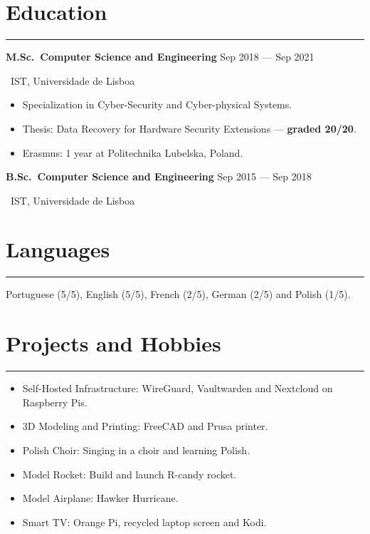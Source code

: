 \documentclass[11pt,a4paper]{article}
\begin{document}
\section*{Education}

\hrule

\textbf{M.Sc.\ Computer Science and Engineering}
\hfill
Sep 2018 --- Sep 2021

\faUniversity\ IST, Universidade de Lisboa

\begin{itemize}[noitemsep]
  \item Specialization in Cyber-Security and Cyber-physical Systems.
  \item Thesis: Data Recovery for Hardware Security Extensions ---
  \textbf{graded 20/20}.
  \item Erasmus: 1 year at Politechnika Lubelska, Poland.
\end{itemize}

\textbf{B.Sc.\ Computer Science and Engineering}
\hfill
Sep 2015 --- Sep 2018

\faUniversity\ IST, Universidade de Lisboa

\section*{Languages}

\hrule

Portuguese (5/5), English (5/5), French (2/5), German (2/5) and Polish (1/5).

\section*{Projects and Hobbies}

\hrule

\begin{itemize}[noitemsep]
  \item Self-Hosted Infrastructure: WireGuard, Vaultwarden and Nextcloud on
  Raspberry Pis.
  \item 3D Modeling and Printing: FreeCAD and Prusa printer.
  \item Polish Choir: Singing in a choir and learning Polish.
  \item Model Rocket: Build and launch R-candy rocket.
  \item Model Airplane: Hawker Hurricane.
  \item Smart TV\@: Orange Pi, recycled laptop screen and Kodi.
\end{itemize}
\end{document}
